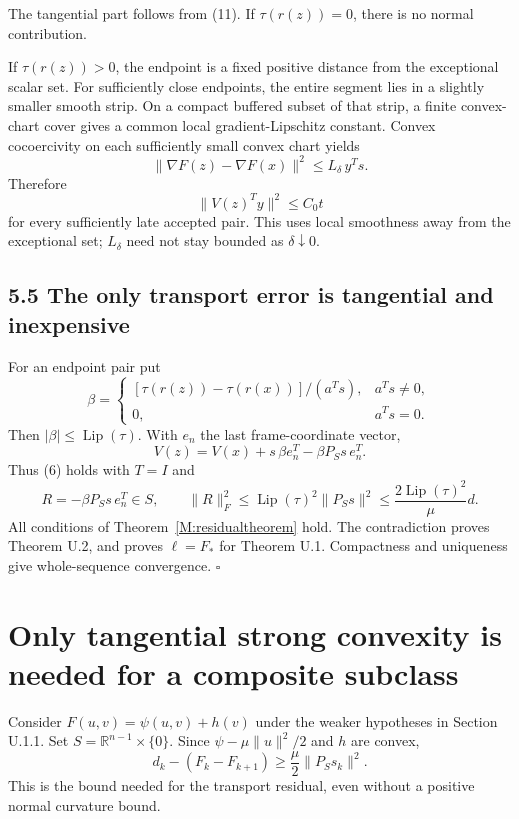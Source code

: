 The tangential part follows from (11). If \(\tau(r(z))=0\), there is no
normal contribution.

If \(\tau(r(z))>0\), the endpoint is a fixed positive distance from the
exceptional scalar set. For sufficiently close endpoints, the entire
segment lies in a slightly smaller smooth strip. On a compact buffered
subset of that strip, a finite convex-chart cover gives a common local
gradient-Lipschitz constant. Convex cocoercivity on each sufficiently
small convex chart yields \[
 \|\nabla F(z)-\nabla F(x)\|^2\le L_\delta\,y^Ts.
\] Therefore \[
 \|V(z)^Ty\|^2\le C_0t\tag{U.13}
\] for every sufficiently late accepted pair. This uses local smoothness
away from the exceptional set; \(L_\delta\) need not stay bounded as
\(\delta\downarrow0\).

\subsection{5.5 The only transport error is tangential and
inexpensive}\label{U:the-only-transport-error-is-tangential-and-inexpensive}

For an endpoint pair put \[
 \beta=\begin{cases}
 [\tau(r(z))-\tau(r(x))]/(a^Ts),&a^Ts\ne0,\\
 0,&a^Ts=0.
 \end{cases}
\] Then \(|\beta|\le\operatorname{Lip}(\tau)\). With \(e_n\) the last
frame-coordinate vector, \[
 \boxed{
 V(z)=V(x)+s\,\beta e_n^T-\beta P_Ss\,e_n^T.
 }\tag{U.14}
\] Thus (6) holds with \(T=I\) and \[
 R=-\beta P_Ss\,e_n^T\in S,
 \qquad
 \|R\|_F^2\le\operatorname{Lip}(\tau)^2\|P_Ss\|^2
 \le\frac{2\operatorname{Lip}(\tau)^2}{\mu}d.\tag{U.15}
\] All conditions of Theorem~\ref{M:residualtheorem} hold. The contradiction proves Theorem U.2,
and proves \(\ell=F_*\) for Theorem U.1. Compactness and uniqueness give
whole-sequence convergence. \(\square\)


\setcounter{section}{5}
\setcounter{theorem}{0}
\setcounter{lemma}{0}
\setcounter{corollary}{0}
\setcounter{proposition}{0}
\setcounter{remark}{0}
\setcounter{equation}{0}
\section{Only tangential strong convexity is needed for a composite
subclass}\label{U:only-tangential-strong-convexity-is-needed-for-a-composite-subclass}

Consider \(F(u,v)=\psi(u,v)+h(v)\) under the weaker hypotheses in
Section U.1.1. Set \(S=\mathbb R^{n-1}\times\{0\}\). Since
\(\psi-\mu\|u\|^2/2\) and \(h\) are convex, \[
 d_k-(F_k-F_{k+1})\ge\frac\mu2\|P_Ss_k\|^2.\tag{U.16}
\] This is the bound needed for the transport residual, even without a
positive normal curvature bound.

